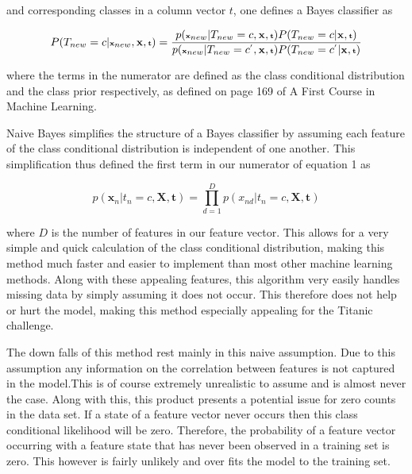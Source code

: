 \documentclass{article}
\begin{document}
and corresponding classes in a column vector $t$, 
one defines a Bayes classifier as

\begin{equation} \tiny{P(T_{new}=c|\textbf{x}_{new},\textbf{X},\textbf{t})=\frac{p(\textbf{x}_{new}|T_{new}=c,\textbf{X},\textbf{t})P(T_{new}=c|\textbf{X},\textbf{t})}{ p(\textbf{x}_{new}|T_{new}=c^{'},\textbf{X},\textbf{t})P(T_{new}=c^{'}|\textbf{X},\textbf{t})}}
\end{equation}


where the terms in the numerator are defined as the class conditional distribution and the class prior respectively, as defined on page 169 of A First Course in Machine Learning.

Naive Bayes simplifies the structure of a Bayes classifier by assuming each feature of the class conditional distribution is independent of one another. This simplification thus defined the first term in our numerator of equation 1 as 

\begin{equation}
    p(\textbf{x}_{n}|t_{n}=c,\textbf{X},\textbf{t})= \prod_{d=1}^D p(x_{nd}|t_{n}=c,\textbf{X},\textbf{t})
\end{equation}

where $D$ is the number of features in our feature vector. This allows for a very simple and quick calculation of the class conditional distribution, making this method much faster and easier to implement than most other machine learning methods. Along with these appealing features, this algorithm very easily handles missing data by simply assuming it does not occur. This therefore does not help or hurt the model, making this method especially appealing for the Titanic challenge.

The down falls of this method rest mainly in this naive assumption. Due to this assumption any information on the correlation between features is not captured in the model.This is of course extremely unrealistic to assume and is almost never the case. Along with this, this product presents a potential issue for zero counts in the data set. If a state of a feature vector never occurs then this class conditional likelihood will be zero. Therefore, the probability of a feature vector occurring with a feature state that has never been observed in a training set is zero. This however is fairly unlikely and over fits the model to the training set.
\end{document}
